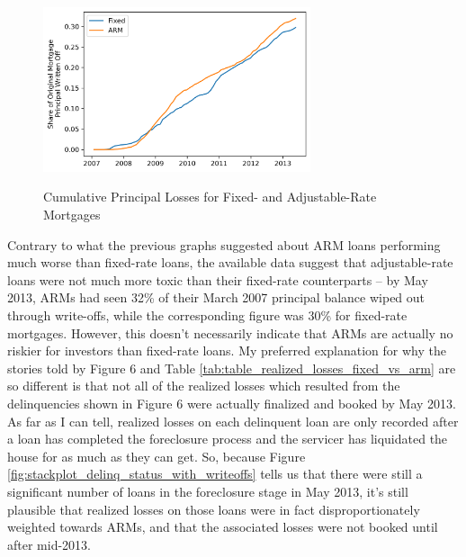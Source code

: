 \documentclass[12pt]{article}
\begin{document}
\begin{figure}[h]
	\centering
	\caption{Cumulative Principal Losses for Fixed- and Adjustable-Rate Mortgages}
	\includegraphics[width=0.7\textwidth]{../figures/timeseries_cumulative_losses_fixed_vs_arm}
	\label{fig:timeseries_cumulative_losses_fixed_vs_arm}
\end{figure}

Contrary to what the previous graphs suggested about ARM loans performing much worse than fixed-rate loans, the available data suggest that adjustable-rate loans were not much more toxic than their fixed-rate counterparts – by May 2013, ARMs had seen 32\% of their March 2007 principal balance wiped out through write-offs, while the corresponding figure was 30\% for fixed-rate mortgages. However, this doesn't necessarily indicate that ARMs are actually no riskier for investors than fixed-rate loans. My preferred explanation for why the stories told by Figure 6 and Table \ref{tab:table_realized_losses_fixed_vs_arm} are so different is that not all of the realized losses which resulted from the delinquencies shown in Figure 6 were actually finalized and booked by May 2013. As far as I can tell, realized losses on each delinquent loan are only recorded after a loan has completed the foreclosure process and the servicer has liquidated the house for as much as they can get. So, because Figure \ref{fig:stackplot_delinq_status_with_writeoffs} tells us that there were still a significant number of loans in the foreclosure stage in May 2013, it's still plausible that realized losses on those loans were in fact disproportionately weighted towards ARMs, and that the associated losses were not booked until after mid-2013.
\end{document}

